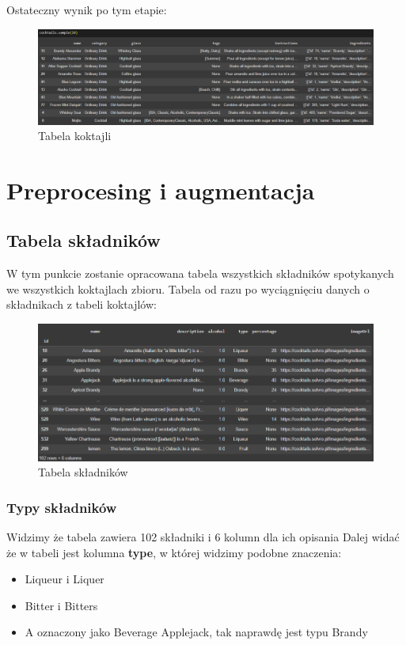 \documentclass{article}
\begin{document}
Ostateczny wynik po tym etapie:
\begin{figure}[htbp]
\centering
    \includegraphics[width=1\linewidth]{cocktails_1.png}
    \caption{Tabela koktajli}
\end{figure}


\clearpage

\section{Preprocesing i augmentacja}
\subsection{Tabela składników}
W tym punkcie zostanie opracowana tabela wszystkich składników spotykanych we wszystkich koktajlach zbioru.
Tabela od razu po wyciągnięciu danych o składnikach z tabeli koktajlów:
\begin{figure}[h]
\centering
    \includegraphics[width=1\linewidth]{ingredients_1.png}
    \caption{Tabela składników}
\end{figure}



\subsubsection{Typy składników}
Widzimy że tabela zawiera 102 składniki i 6 kolumn dla ich opisania
Dalej widać że w tabeli jest kolumna \textbf{type}, w której widzimy podobne znaczenia:
\begin{itemize}
    \item Liqueur i Liquer
    \item Bitter i Bitters
    \item A oznaczony jako Beverage Applejack, tak naprawdę jest typu Brandy
\end{itemize}
\end{document}
